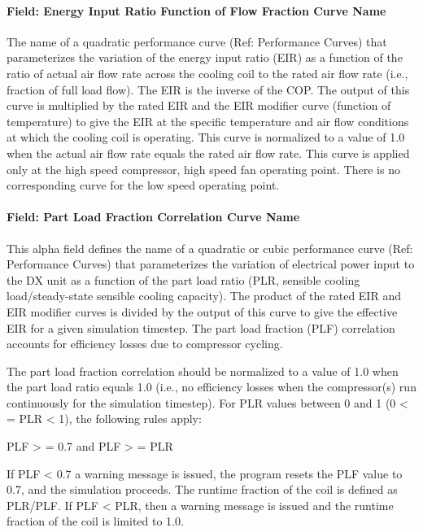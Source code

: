 \paragraph{Field: Energy Input Ratio Function of Flow Fraction Curve Name}\label{field-energy-input-ratio-function-of-flow-fraction-curve-name-1}

The name of a quadratic performance curve (Ref: Performance Curves) that parameterizes the variation of the energy input ratio (EIR) as a function of the ratio of actual air flow rate across the cooling coil to the rated air flow rate (i.e., fraction of full load flow). The EIR is the inverse of the COP. The output of this curve is multiplied by the rated EIR and the EIR modifier curve (function of temperature) to give the EIR at the specific temperature and air flow conditions at which the cooling coil is operating. This curve is normalized to a value of 1.0 when the actual air flow rate equals the rated air flow rate. This curve is applied only at the high speed compressor, high speed fan operating point. There is no corresponding curve for the low speed operating point.

\paragraph{Field: Part Load Fraction Correlation Curve Name}\label{field-part-load-fraction-correlation-curve-name-3}

This alpha field defines the name of a quadratic or cubic performance curve (Ref: Performance Curves) that parameterizes the variation of electrical power input to the DX unit as a function of the part load ratio (PLR, sensible cooling load/steady-state sensible cooling capacity). The product of the rated EIR and EIR modifier curves is divided by the output of this curve to give the effective EIR for a given simulation timestep. The part load fraction (PLF) correlation accounts for efficiency losses due to compressor cycling.

The part load fraction correlation should be normalized to a value of 1.0 when the part load ratio equals 1.0 (i.e., no efficiency losses when the compressor(s) run continuously for the simulation timestep). For PLR values between 0 and 1 (0 \textless{} = PLR \textless{} 1), the following rules apply:

PLF \textgreater{} = 0.7 and PLF \textgreater{} = PLR

If PLF \textless{} 0.7 a warning message is issued, the program resets the PLF value to 0.7, and the simulation proceeds. The runtime fraction of the coil is defined as PLR/PLF. If PLF \textless{} PLR, then a warning message is issued and the runtime fraction of the coil is limited to 1.0.

